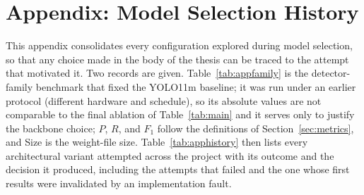 \documentclass[12pt,a4paper,oneside]{report}
\begin{document}




\tableofcontents

\clearpage
{}
\listoftables

\clearpage
{}
\listoffigures



\clearpage
{}










\clearpage
\appendix
{}
{}
\chapter*{Appendix: Model Selection History}
\renewcommand{\thetable}{A.\arabic{table}}
\setcounter{table}{0}
This appendix consolidates every configuration explored during model
selection, so that any choice made in the body of the thesis can be traced
to the attempt that motivated it. Two records are given. Table~\ref{tab:appfamily}
is the detector-family benchmark that fixed the YOLO11m baseline; it was run
under an earlier protocol (different hardware and schedule), so its absolute
values are not comparable to the final ablation of Table~\ref{tab:main} and
it serves only to justify the backbone choice; $P$, $R$, and $F_1$ follow
the definitions of Section~\ref{sec:metrics}, and Size is the weight-file
size. Table~\ref{tab:apphistory}
then lists every architectural variant attempted across the project with its
outcome and the decision it produced, including the attempts that failed and
the one whose first results were invalidated by an implementation fault.
\end{document}
